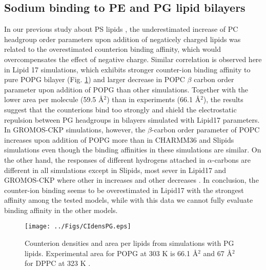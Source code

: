 \documentclass[aps,prl,superscriptaddress,twocolumn]{revtex4}
\begin{document}
\subsection{Sodium binding to PE and PG lipid bilayers}
In our previous study about PS lipids \cite{antila18}, the underestimated increase of PC
headgroup order parameters upon addition of negaticely charged lipids
was related
to the overestimated counterion binding affinity, which would overcompensates the effect of negative charge.
Similar correlation is observed here in %
Lipid 17 simulations, which exhibits stronger counter-ion binding affinity to pure POPG bilayer (Fig. \ref{CIdensPG})
and larger decrease in POPC $\beta$ carbon order parameter upon addition of POPG than other simulations.
Together with the lower area per molecule (59.5 {\AA}$^2$) than in experiments (66.1 {\AA}$^2$),
the results suggest that the counterions bind too strongly and shield the electrostatic repulsion between PG headgroups
in bilayers simulated with Lipid17 parameters.
In GROMOS-CKP simulations, however, the $\beta$-carbon order parameter of POPC
increases upon addition of POPG more than in CHARMM36 and Slipids simulations even though the binding affinities in these
simulations are similar. On the other hand, the responses of different hydrogens attached in $\alpha$-carbons
are different in all simulations except in Slipids, most sever in Lipid17 and GROMOS-CKP where other in increases
and other decreases .
In conclusion, the counter-ion binding seems to be overestimated in Lipid17 with the strongest affinity among the
tested models, while with this data we cannot fully evaluate binding affinity in the other models.
\begin{figure}[]
  \centering
  \texttt{[image: ../Figs/CIdensPG.eps]}
  \caption{\label{CIdensPG}
    Counterion densities and area per lipids from simulations with PG lipids.
    Experimental area for POPG at 303 K is 66.1 {\AA}$^2$ and 67 {\AA}$^2$ for DPPC at 323 K \cite{pan12b}.
  }
\end{figure}
\end{document}
